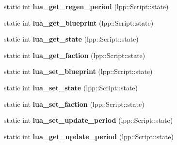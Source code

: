 \begin{DoxyCompactItemize}
\item 
static int {\bfseries lua\+\_\+get\+\_\+regen\+\_\+period} (lpp\+::\+Script\+::state)\hypertarget{class_lua_interface_ae0dcd4a82349af550b8fdba73572fa21}{}\label{class_lua_interface_ae0dcd4a82349af550b8fdba73572fa21}

\item 
static int {\bfseries lua\+\_\+get\+\_\+blueprint} (lpp\+::\+Script\+::state)\hypertarget{class_lua_interface_a81784ffcdeee3f2046e8aa83a69c469e}{}\label{class_lua_interface_a81784ffcdeee3f2046e8aa83a69c469e}

\item 
static int {\bfseries lua\+\_\+get\+\_\+state} (lpp\+::\+Script\+::state)\hypertarget{class_lua_interface_a01ab99505ea106844e503229453dc061}{}\label{class_lua_interface_a01ab99505ea106844e503229453dc061}

\item 
static int {\bfseries lua\+\_\+get\+\_\+faction} (lpp\+::\+Script\+::state)\hypertarget{class_lua_interface_aa3bf4d724ab422195a87dee6fa47b8f5}{}\label{class_lua_interface_aa3bf4d724ab422195a87dee6fa47b8f5}

\item 
static int {\bfseries lua\+\_\+set\+\_\+blueprint} (lpp\+::\+Script\+::state)\hypertarget{class_lua_interface_a35e1b50a4806759079274c119ab4422f}{}\label{class_lua_interface_a35e1b50a4806759079274c119ab4422f}

\item 
static int {\bfseries lua\+\_\+set\+\_\+state} (lpp\+::\+Script\+::state)\hypertarget{class_lua_interface_af0cbeb5800d07f17a83be567ce3b2441}{}\label{class_lua_interface_af0cbeb5800d07f17a83be567ce3b2441}

\item 
static int {\bfseries lua\+\_\+set\+\_\+faction} (lpp\+::\+Script\+::state)\hypertarget{class_lua_interface_a707dc7a21fee45ae0c93e6ab0d3518b3}{}\label{class_lua_interface_a707dc7a21fee45ae0c93e6ab0d3518b3}

\item 
static int {\bfseries lua\+\_\+set\+\_\+update\+\_\+period} (lpp\+::\+Script\+::state)\hypertarget{class_lua_interface_a980557a657424ffa05c755b48ad82261}{}\label{class_lua_interface_a980557a657424ffa05c755b48ad82261}

\item 
static int {\bfseries lua\+\_\+get\+\_\+update\+\_\+period} (lpp\+::\+Script\+::state)\hypertarget{class_lua_interface_a6ec45ebaf5512a324fa0c3ce3d9ec76b}{}\label{class_lua_interface_a6ec45ebaf5512a324fa0c3ce3d9ec76b}


\end{DoxyCompactItemize}
